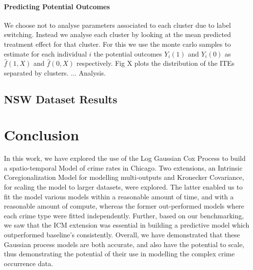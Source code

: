 \documentclass{article}
\begin{document}
\paragraph{Predicting Potential Outcomes} We choose not to analyse parameters associated to each cluster due to label switching. Instead we analyse each cluster by looking at the mean predicted treatment effect for that cluster. For this we use the monte carlo samples to estimate for each individual $i$ the potential outcomes $Y_i(1)$ and $Y_i(0)$ as $\hat{f}(1,X)$ and $\hat{f}(0,X)$ respectively. Fig X plots the distribution of the ITEs separated by clusters. ... Analysis.

\subsection{NSW Dataset Results} 




\section{Conclusion}
In this work, we have explored the use of the Log Gaussian Cox Process to build a spatio-temporal Model of crime rates in Chicago. Two extensions, an Intrinsic Coregionalization Model for modelling multi-outputs and Kronecker Covariance, for scaling the model to larger datasets, were explored. The latter enabled us to fit the model various models within a reasonable amount of time, and with a reasonable amount of compute, whereas the former out-performed models where each crime type were fitted independently. Further, based on our benchmarking, we saw that the ICM extension was essential in building a predictive model which outperformed baseline's consistently. Overall, we have demonstrated that these Gaussian process models are both accurate, and also have the potential to scale, thus demonstrating the potential of their use in modelling the complex crime occurrence data. 




\appendix
\end{document}
